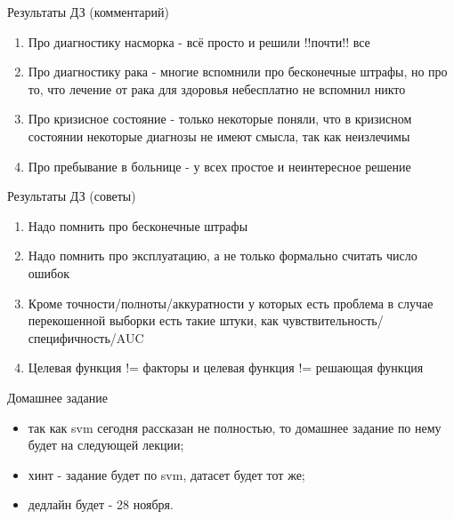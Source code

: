\documentclass[14pt, fleqn, xcolor={dvipsnames, table}]{beamer}
\begin{document}
\begin{frame}{Результаты ДЗ (комментарий)}
\begin{enumerate}
\item Про диагностику насморка - всё просто и решили !!почти!! все
\item Про диагностику рака - многие вспомнили про бесконечные штрафы, но про то, что лечение от рака для здоровья небесплатно не вспомнил никто
\item Про кризисное состояние - только некоторые поняли, что в кризисном состоянии некоторые диагнозы не имеют смысла, так как неизлечимы
\item Про пребывание в больнице - у всех простое и неинтересное решение
\end{enumerate}
\end{frame}


\begin{frame}{Результаты ДЗ (советы)}
\begin{enumerate}
\item Надо помнить про бесконечные штрафы
\item Надо помнить про эксплуатацию, а не только формально считать число ошибок
\item Кроме точности/полноты/аккуратности у которых есть проблема в случае перекошенной выборки есть такие штуки, как чувствительность/специфичность/AUC
\item Целевая функция != факторы и целевая функция != решающая функция
\end{enumerate}
\end{frame}


\begin{frame}{Домашнее задание}
\begin{itemize}
\item так как svm сегодня рассказан не полностью, то домашнее задание по нему будет на следующей лекции;
\item хинт - задание будет по svm, датасет будет тот же;
\item дедлайн будет - 28 ноября.
\end{itemize}
\end{frame}
\end{document}
